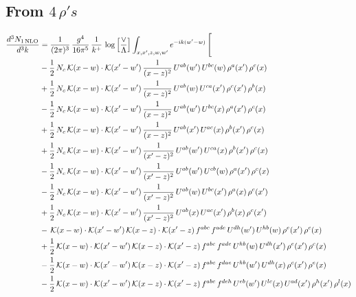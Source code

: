 \documentclass[9pt]{article}
\numberwithin{equation}{section}
\begin{document}
\subsection{From $4\, \rho's$}
\begin{align}
\frac{d^{3}N_{1\,\mathrm{NLO}}}{d^{3}k} & = \frac{1}{(2\pi)^{3}}\,\frac{g^{4}}{16\pi^{5}}\,\frac{1}{k^{+}}\,\log\Big[\frac{\vee}{\Lambda}\Big]\int_{x,x',z,w,w'}e^{-ik(w'-w)}\,\Bigg[\notag\\ & -\frac{1}{2}\,N_{c}\,\mathcal{K}(x-w)\cdot\mathcal{K}(x'-w')\,\frac{1}{(x-z)^{2}}\,U^{ab}(w')\,U^{bc}(w)\,\rho^{a}(x')\,\rho^{c}(x)\notag\\
& +\frac{1}{2}\,N_{c}\,\mathcal{K}(x-w)\cdot\mathcal{K}(x'-w')\,\frac{1}{(x-z)^{2}}\,U^{ab}(w)\,U^{ca}(x')\,\rho^{c}(x')\,\rho^{b}(x)\notag\\
& -\frac{1}{2}\,N_{c}\,\mathcal{K}(x-w)\cdot\mathcal{K}(x'-w')\,\frac{1}{(x-z)^{2}}\,U^{ab}(w')\,U^{bc}(x)\,\rho^{a}(x')\,\rho^{c}(x)\notag\\
& +\frac{1}{2}\,N_{c}\,\mathcal{K}(x-w)\cdot\mathcal{K}(x'-w')\,\frac{1}{(x-z)^{2}}\,U^{ab}(x')\,U^{ac}(x)\,\rho^{b}(x')\,\rho^{c}(x)\notag\\
& +\frac{1}{2}\,N_{c}\,\mathcal{K}(x-w)\cdot\mathcal{K}(x'-w')\,\frac{1}{(x'-z)^{2}}\,U^{ab}(w')\,U^{ca}(x)\,\rho^{b}(x')\,\rho^{c}(x)\notag\\
& -\frac{1}{2}\,N_{c}\,\mathcal{K}(x-w)\cdot\mathcal{K}(x'-w')\,\frac{1}{(x'-z)^{2}}\,U^{ab}(w')\,U^{cb}(w)\,\rho^{a}(x')\,\rho^{c}(x)\notag\\
& -\frac{1}{2}\,N_{c}\,\mathcal{K}(x-w)\cdot\mathcal{K}(x'-w')\,\frac{1}{(x'-z)^{2}}\,U^{ab}(w)\,U^{bc}(x')\,\rho^{a}(x)\,\rho^{c}(x')\notag\\
& +\frac{1}{2}\,N_{c}\,\mathcal{K}(x-w)\cdot\mathcal{K}(x'-w')\,\frac{1}{(x'-z)^{2}}\,U^{ab}(x)\,U^{ac}(x')\,\rho^{b}(x)\,\rho^{c}(x')\notag\\
& -\,\mathcal{K}(x-w)\cdot\mathcal{K}(x'-w')\,\mathcal{K}(x-z)\cdot\mathcal{K}(x'-z)\,f^{abc}\,f^{ade}\,U^{dh}(w')\,U^{hb}(w)\,\rho^{e}(x')\,\rho^{c}(x)\notag\\
& +\frac{1}{2}\,\mathcal{K}(x-w)\cdot\mathcal{K}(x'-w')\,\mathcal{K}(x-z)\cdot\mathcal{K}(x'-z)\,f^{abc}\,f^{ade}\,U^{hb}(w)\,U^{dh}(x')\,\rho^{e}(x')\,\rho^{c}(x)\notag\\
& -\frac{1}{2}\,\mathcal{K}(x-w)\cdot\mathcal{K}(x'-w')\,\mathcal{K}(x-z)\cdot\mathcal{K}(x'-z)\,f^{abc}\,f^{dae}\,U^{hb}(w')\,U^{dh}(x)\,\rho^{c}(x')\,\rho^{e}(x)\notag\\
& -\frac{1}{2}\,\mathcal{K}(x-w)\cdot\mathcal{K}(x'-w')\,\mathcal{K}(x-z)\cdot\mathcal{K}(x'-z)\,f^{abc}\,f^{deh}\,U^{eb}(w')\,U^{lc}(x)\,U^{ad}(x')\,\rho^{h}(x')\,\rho^{l}(x)\notag\\

\end{align}
\end{document}
